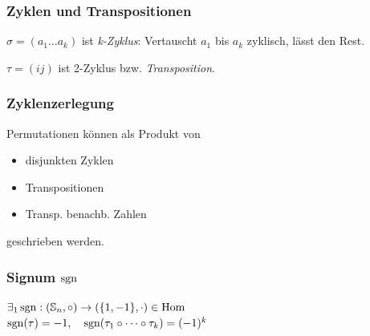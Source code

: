 \subsubsection*{Zyklen und Transpositionen}
$\sigma = (a_1 \dots a_k)$ ist \textit{k-Zyklus}:
Vertauscht $a_1$ bis $a_k$ zyklisch, lässt den Rest.

$\tau  = (i j)$ ist 2-Zyklus bzw. \textit{Transposition}.

\subsubsection*{Zyklenzerlegung}
Permutationen können als Produkt von
\begin{itemize}
	\item disjunkten Zyklen
	\item Transpositionen
	\item Transp. benachb. Zahlen
\end{itemize}
geschrieben werden.

\subsubsection*{Signum $\operatorname{sgn}$}
$\exists_1 \operatorname{sgn} : (\mathbb{S}_n, \circ) \to (\{1,-1\},\cdot) \in \operatorname{Hom}$ \\
$\operatorname{sgn}(\tau)=-1, \quad \operatorname{sgn}(\tau_1 \circ \dots \circ \tau_k)=(-1)^k$

